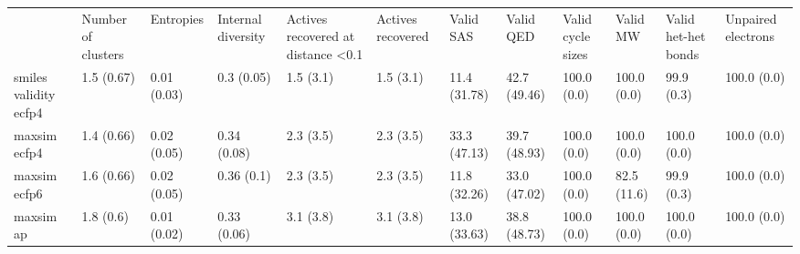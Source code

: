 \begin{tabular}{llllllllllll}
 & Number of clusters & Entropies & Internal diversity & Actives recovered at distance <0.1 & Actives recovered & Valid SAS & Valid QED & Valid cycle sizes & Valid MW & Valid het-het bonds & Unpaired electrons \\
smiles validity ecfp4 & {\cellcolor[HTML]{F5FBFD}} \color[HTML]{000000} 1.5 (0.67) & {\cellcolor[HTML]{F7FCFD}} \color[HTML]{000000} 0.01 (0.03) & {\cellcolor[HTML]{60BF9C}} \color[HTML]{000000} 0.3 (0.05) & {\cellcolor[HTML]{ECF8FB}} \color[HTML]{000000} 1.5 (3.1) & {\cellcolor[HTML]{ECF8FB}} \color[HTML]{000000} 1.5 (3.1) & {\cellcolor[HTML]{E7F6F9}} \color[HTML]{000000} 11.4 (31.78) & {\cellcolor[HTML]{84CFB9}} \color[HTML]{000000} 42.7 (49.46) & {\cellcolor[HTML]{00441B}} \color[HTML]{F1F1F1} 100.0 (0.0) & {\cellcolor[HTML]{1C8540}} \color[HTML]{F1F1F1} 100.0 (0.0) & {\cellcolor[HTML]{00441B}} \color[HTML]{F1F1F1} 99.9 (0.3) & {\cellcolor[HTML]{00441B}} \color[HTML]{F1F1F1} 100.0 (0.0) \\
maxsim ecfp4 & {\cellcolor[HTML]{F5FBFD}} \color[HTML]{000000} 1.4 (0.66) & {\cellcolor[HTML]{F7FCFD}} \color[HTML]{000000} 0.02 (0.05) & {\cellcolor[HTML]{7ACBB3}} \color[HTML]{000000} 0.34 (0.08) & {\cellcolor[HTML]{F7FCFD}} \color[HTML]{000000} 2.3 (3.5) & {\cellcolor[HTML]{F7FCFD}} \color[HTML]{000000} 2.3 (3.5) & {\cellcolor[HTML]{AADFD3}} \color[HTML]{000000} 33.3 (47.13) & {\cellcolor[HTML]{90D4C3}} \color[HTML]{000000} 39.7 (48.93) & {\cellcolor[HTML]{00441B}} \color[HTML]{F1F1F1} 100.0 (0.0) & {\cellcolor[HTML]{137D39}} \color[HTML]{F1F1F1} 100.0 (0.0) & {\cellcolor[HTML]{00471C}} \color[HTML]{F1F1F1} 100.0 (0.0) & {\cellcolor[HTML]{00441B}} \color[HTML]{F1F1F1} 100.0 (0.0) \\
maxsim ecfp6 & {\cellcolor[HTML]{F5FBFC}} \color[HTML]{000000} 1.6 (0.66) & {\cellcolor[HTML]{F7FCFD}} \color[HTML]{000000} 0.02 (0.05) & {\cellcolor[HTML]{68C3A6}} \color[HTML]{000000} 0.36 (0.1) & {\cellcolor[HTML]{F7FCFD}} \color[HTML]{000000} 2.3 (3.5) & {\cellcolor[HTML]{F7FCFD}} \color[HTML]{000000} 2.3 (3.5) & {\cellcolor[HTML]{E6F5F9}} \color[HTML]{000000} 11.8 (32.26) & {\cellcolor[HTML]{ACDFD4}} \color[HTML]{000000} 33.0 (47.02) & {\cellcolor[HTML]{00441B}} \color[HTML]{F1F1F1} 100.0 (0.0) & {\cellcolor[HTML]{0D7836}} \color[HTML]{F1F1F1} 82.5 (11.6) & {\cellcolor[HTML]{00441B}} \color[HTML]{F1F1F1} 99.9 (0.3) & {\cellcolor[HTML]{00441B}} \color[HTML]{F1F1F1} 100.0 (0.0) \\
maxsim ap & {\cellcolor[HTML]{F5FBFC}} \color[HTML]{000000} 1.8 (0.6) & {\cellcolor[HTML]{F1FAFC}} \color[HTML]{000000} 0.01 (0.02) & {\cellcolor[HTML]{9CD9CA}} \color[HTML]{000000} 0.33 (0.06) & {\cellcolor[HTML]{F7FCFD}} \color[HTML]{000000} 3.1 (3.8) & {\cellcolor[HTML]{F7FCFD}} \color[HTML]{000000} 3.1 (3.8) & {\cellcolor[HTML]{E4F5F8}} \color[HTML]{000000} 13.0 (33.63) & {\cellcolor[HTML]{94D6C5}} \color[HTML]{000000} 38.8 (48.73) & {\cellcolor[HTML]{00441B}} \color[HTML]{F1F1F1} 100.0 (0.0) & {\cellcolor[HTML]{0A7633}} \color[HTML]{F1F1F1} 100.0 (0.0) & {\cellcolor[HTML]{00451C}} \color[HTML]{F1F1F1} 100.0 (0.0) & {\cellcolor[HTML]{00441B}} \color[HTML]{F1F1F1} 100.0 (0.0) \\

\end{tabular}
